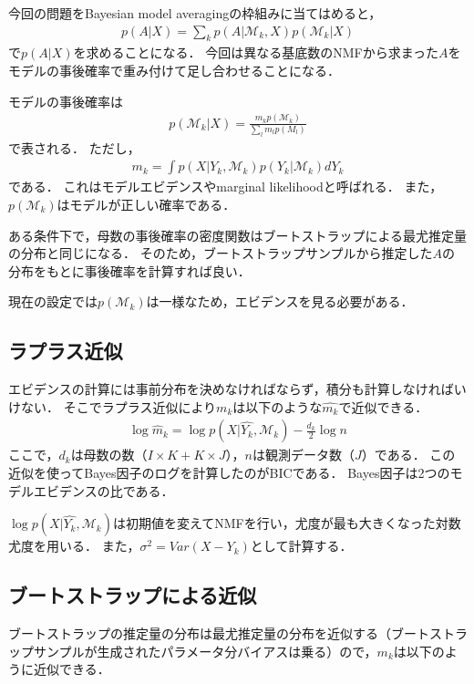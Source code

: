 今回の問題をBayesian model averagingの枠組みに当てはめると，
\begin{align}
	p(A|X) = \sum_k p(A|\mathcal{M}_k, X) p(\mathcal{M}_k | X)
\end{align}
で$p(A|X)$を求めることになる．
今回は異なる基底数のNMFから求まった$A$をモデルの事後確率で重み付けて足し合わせることになる．

モデルの事後確率は
\begin{align}
	p(\mathcal{M}_k|X) = \frac{m_k p(\mathcal{M}_k)}{\sum_l m_l p(M_l)}
\end{align}
で表される．
ただし，
\begin{align}
	m_k = \int p(X | Y_k, \mathcal{M}_k) p(Y_k| \mathcal{M}_k) dY_k
	\label{eq:evidence}
\end{align}
である．
これはモデルエビデンスやmarginal likelihoodと呼ばれる．
また，$p(\mathcal{M}_k)$はモデルが正しい確率である．

ある条件下で，母数の事後確率の密度関数はブートストラップによる最尤推定量の分布と同じになる．
そのため，ブートストラップサンプルから推定した$A$の分布をもとに事後確率を計算すれば良い．

現在の設定では$p(\mathcal{M}_k)$は一様なため，エビデンスを見る必要がある．

\subsection{ラプラス近似}
エビデンスの計算には事前分布を決めなければならず，積分も計算しなければいけない．
そこでラプラス近似により$m_k$は以下のような$\hat{m_k}$で近似できる．
\begin{align}
	\log \hat{m}_k = \log p(X | \hat{Y_k}, \mathcal{M}_k) - \frac{d_k}{2} \log n
	\label{eq:simm}
\end{align}
ここで，$d_k$は母数の数（$I \times K + K \times J$），$n$は観測データ数（$J$）である．
この近似を使ってBayes因子のログを計算したのがBICである．
Bayes因子は2つのモデルエビデンスの比である．

$\log p(X | \hat{Y_k}, \mathcal{M}_k)$は初期値を変えてNMFを行い，尤度が最も大きくなった対数尤度を用いる．
また，$\sigma^2 = Var(X - Y_k)$として計算する．

\subsection{ブートストラップによる近似}
ブートストラップの推定量の分布は最尤推定量の分布を近似する（ブートストラップサンプルが生成されたパラメータ分バイアスは乗る）ので，$m_k$は以下のように近似できる．

